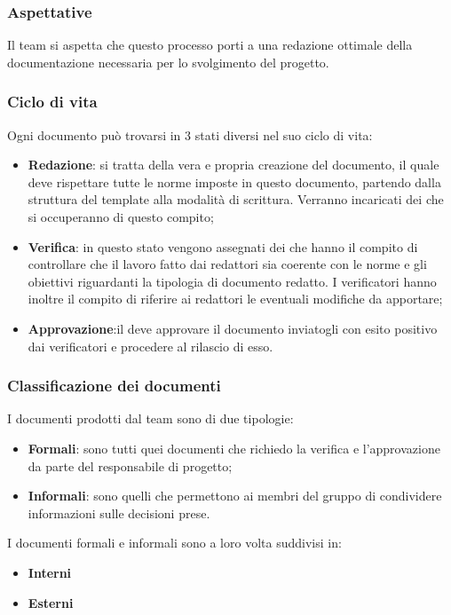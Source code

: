 \subsubsection{Aspettative}
Il team si aspetta che questo processo porti a una redazione ottimale della documentazione necessaria per lo svolgimento del progetto.

\subsubsection{Ciclo di vita}
Ogni documento può trovarsi in 3 stati diversi nel suo ciclo di vita:
\begin{itemize}
    \item\textbf{Redazione}: si tratta della vera e propria creazione del documento, il quale deve rispettare tutte le norme imposte in questo documento, partendo dalla struttura del template alla modalità di scrittura. Verranno incaricati dei  che si occuperanno di questo compito;
    \item\textbf{Verifica}: in questo stato vengono assegnati dei  che hanno il compito di controllare che il lavoro fatto dai redattori sia coerente con le norme e gli obiettivi riguardanti la tipologia di documento redatto. I verificatori hanno inoltre il compito di riferire ai redattori le eventuali modifiche da apportare;
    \item\textbf{Approvazione}:il  deve approvare il documento inviatogli con esito positivo dai verificatori e procedere al rilascio di esso.
\end{itemize}

\subsubsection{Classificazione dei documenti}
I documenti prodotti dal team sono di due tipologie:
\begin{itemize}
    \item \textbf{Formali}: sono tutti quei documenti che richiedo la verifica e l'approvazione da parte del responsabile di progetto;
    \item\textbf{Informali}: sono quelli che permettono ai membri del gruppo di condividere informazioni sulle decisioni prese.
\end{itemize}
I documenti formali e informali sono a loro volta suddivisi in:
\begin{itemize}
    \item\textbf{Interni}
    \item\textbf{Esterni}
\end{itemize}

